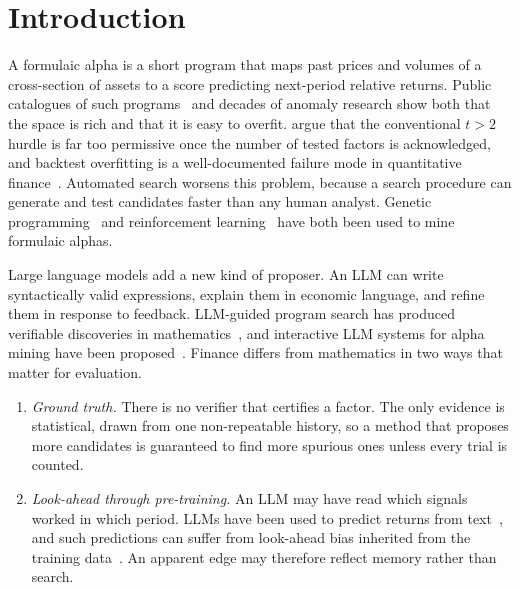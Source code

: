 \section{Introduction}
\label{sec:introduction}

A formulaic alpha is a short program that maps past prices and volumes of a
cross-section of assets to a score predicting next-period relative returns.
Public catalogues of such programs~\citep{kakushadze2016alphas} and decades of
anomaly research show both that the space is rich and that it is easy to
overfit. \citet{harvey2016cross} argue that the conventional $t>2$ hurdle is
far too permissive once the number of tested factors is acknowledged, and
backtest overfitting is a well-documented failure mode in quantitative
finance~\citep{bailey2014deflated,bailey2017pbo}. Automated search worsens
this problem, because a search procedure can generate and test candidates
faster than any human analyst. Genetic
programming~\citep{koza1992genetic} and reinforcement
learning~\citep{yu2023alphagen} have both been used to mine formulaic alphas.

Large language models add a new kind of proposer. An LLM can write
syntactically valid expressions, explain them in economic language, and
refine them in response to feedback. LLM-guided program search has produced
verifiable discoveries in mathematics~\citep{romeraparedes2024funsearch}, and
interactive LLM systems for alpha mining have been
proposed~\citep{wang2023alphagpt}. Finance differs from mathematics in two ways
that matter for evaluation.
\begin{enumerate}
  \item \emph{Ground truth.} There is no verifier that certifies a factor. The
    only evidence is statistical, drawn from one non-repeatable history, so a
    method that proposes more candidates is guaranteed to find more spurious
    ones unless every trial is counted.
  \item \emph{Look-ahead through pre-training.} An LLM may have read which
    signals worked in which period. LLMs have been used to predict returns from
    text~\citep{lopezlira2023chatgpt}, and such predictions can suffer from
    look-ahead bias inherited from the training
    data~\citep{glasserman2023lookahead}. An apparent edge may therefore
    reflect memory rather than search.
\end{enumerate}

